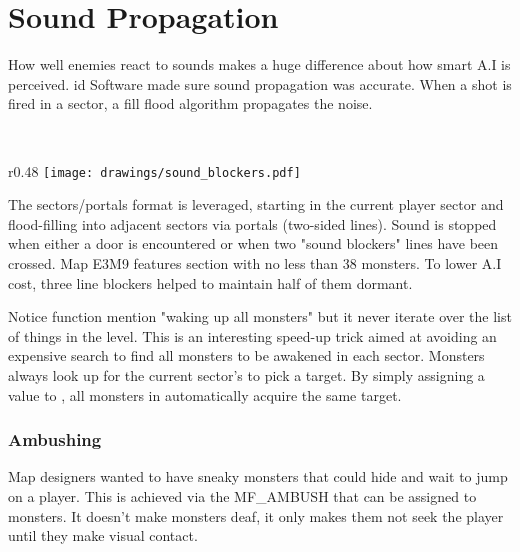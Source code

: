 \section{Sound Propagation}
How well enemies react to sounds makes a huge difference about how smart A.I is perceived. id Software made sure sound propagation was accurate. When a shot is fired in a sector, a fill flood algorithm propagates the noise.\\
\par
{}\\

\begin{wrapfigure}[10]{r}{0.48\textwidth}
\centering
\texttt{[image: drawings/sound\_blockers.pdf]}
\end{wrapfigure}
  The sectors/portals format is leveraged, starting in the current player sector and flood-filling into adjacent sectors via portals (two-sided lines). Sound is stopped when either a door is encountered or when two "sound blockers" lines have been crossed. Map E3M9 features section with no less than 38 monsters. To lower A.I cost, three line blockers helped to maintain half of them dormant.\\
\par
Notice function  mention "waking up all monsters" but it never iterate over the list of things in the level. This is an interesting speed-up trick aimed at avoiding an expensive search to find all monsters to be awakened in each sector. Monsters always look up for the current sector's  to pick a target. By simply assigning a value to , all monsters in  automatically acquire the same target.\\
\par
{}
\par
\subsubsection{Ambushing}
Map designers wanted to have sneaky monsters that could hide and wait to jump on a player. This is achieved via the MF\_AMBUSH that can be assigned to monsters. It doesn't make monsters deaf, it only makes them not seek the player until they make visual contact.



